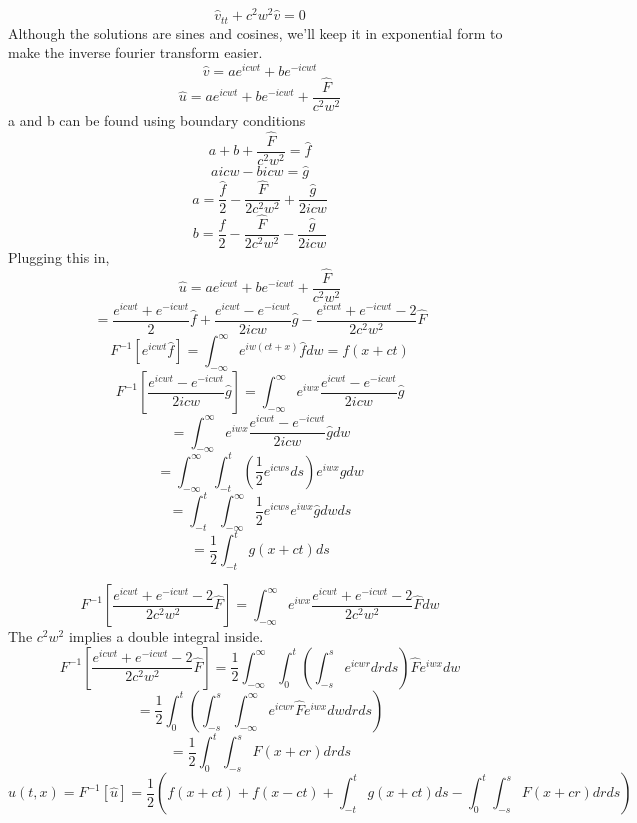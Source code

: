 \documentclass[a4paper,12 pt]{article}
\begin{document}
\begin{enumerate}
\[\hat{v}_{tt} +c^2w^2\hat{v}=0 \]
Although the solutions are sines and cosines, we'll keep it in exponential form to make the inverse fourier transform easier.
\[\hat{v} = ae^{icwt}+ be^{-icwt}\]
\[\hat{u} = ae^{icwt}+ be^{-icwt}+\frac{\hat{F}}{c^2w^2}\]
a and b can be found using boundary conditions
\[a+b +\frac{\hat{F}}{c^2w^2} = \hat{f}\]
\[aicw- bicw = \hat{g}\]
\[a= \frac{\hat{f}}{2}-\frac{\hat{F}}{2c^2w^2} + \frac{\hat{g}}{2icw}\]
\[b= \frac{\hat{f}}{2}-\frac{\hat{F}}{2c^2w^2} -\frac{\hat{g}}{2icw}\]
Plugging this in,
\[\hat{u} = ae^{icwt}+ be^{-icwt}+\frac{\hat{F}}{c^2w^2}\]
\[= \frac{e^{icwt}+ e^{-icwt}}{2}\hat{f} + \frac{e^{icwt}-e^{-icwt}}{2icw}\hat{g} -\frac{e^{icwt}+ e^{-icwt}-2}{2c^2w^2}\hat{F} \]
\[F^{-1} [e^{icwt}\hat{f}] = \int_{-\infty}^{\infty}e^{iw(ct+x)}\hat{f}dw=f(x+ct) \]
\[F^{-1} [\frac{e^{icwt}-e^{-icwt}}{2icw}\hat{g}] = \int_{-\infty}^{\infty}e^{iwx}\frac{e^{icwt}-e^{-icwt}}{2icw}\hat{g}\]
\[ =\int_{-\infty}^{\infty}e^{iwx}\frac{e^{icwt}-e^{-icwt}}{2icw}\hat{g}dw \]
\[=\int_{-\infty}^{\infty}\int_{-t}^{t}(\frac{1}{2}e^{icws}ds)  e^{iwx}\hat{g}dw\]
\[=\int_{-t}^{t}\int_{-\infty}^{\infty}\frac{1}{2}e^{icws} e^{iwx}\hat{g}dwds\]
\[=\frac{1}{2} \int_{-t}^{t}g(x+ct)ds\]

\[F^{-1} [\frac{e^{icwt}+ e^{-icwt}-2}{2c^2w^2}\hat{F}] = \int_{-\infty}^{\infty}e^{iwx}\frac{e^{icwt}+ e^{-icwt}-2}{2c^2w^2}\hat{F} dw\]
The $c^2w^2$ implies a double integral inside.
\[F^{-1} [\frac{e^{icwt}+ e^{-icwt}-2}{2c^2w^2}\hat{F}] = \frac{1}{2} \int_{-\infty}^{\infty}\int_{0}^{t}(\int_{-s}^{s}e^{icwr}drds)\hat{F} e^{iwx}dw\]
\[= \frac{1}{2} \int_{0}^{t}(\int_{-s}^{s}\int_{-\infty}^{\infty}e^{icwr}\hat{F} e^{iwx}dwdrds)\]
\[= \frac{1}{2} \int_{0}^{t}\int_{-s}^{s}F(x+cr )drds\]
\[u(t,x)= F^{-1} [\hat{u}]= \frac{1}{2} (f(x+ct)+f(x-ct)+ \int_{-t}^{t}g(x+ct)ds-\int_{0}^{t}\int_{-s}^{s}F(x+cr )drds)\]

	\end{enumerate} 
	
\end{document}
